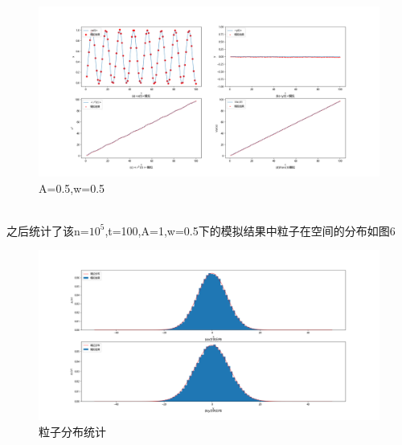 \documentclass{article}
\begin{document}
\begin{figure}[!h]

\centering
\includegraphics[scale=0.4]{A0.5w0.5}
\caption{\heiti{}A=0.5,w=0.5}

\end{figure}


~\\
\newpage
之后统计了该n=$ 10^5 $,t=100,A=1,w=0.5下的模拟结果中粒子在空间的分布如图6
\begin{figure}[!h]
	
	\centering
	\includegraphics[scale=0.4]{distribution}
	\caption{\heiti{}粒子分布统计}
	
\end{figure}
\end{document}
